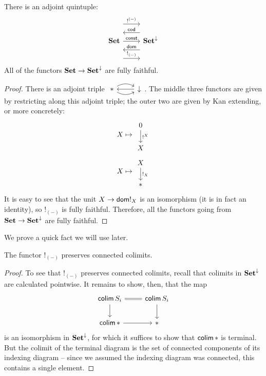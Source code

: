 \begin{prop}
  There is an adjoint quintuple:
  \[
    \begin{tikzcd}
      \Set \arrow[r, "\const"] \arrow[r, leftarrow, shift left = 5,
      "\term{cod}"] \arrow[r, leftarrow, shift right = 5, "\term{dom}"]
      \arrow[r, shift left = 10, "!^{(-)}"]  \arrow[r, shift right = 10, "!_{(-)}"] & \Set^{\downarrow}
    \end{tikzcd}
  \]
  All of the functors $\operatorname{\textbf{Set}} \to \operatorname{\textbf{Set}}^{\downarrow}$ are fully faithful.
\end{prop}
\begin{proof}
There is an adjoint triple $\begin{tikzcd} \ast \arrow[r,leftarrow] \arrow[r,
  bend left] \arrow[r, bend right] & \downarrow \end{tikzcd}$. The middle three
functors are given by restricting along this adjoint triple; the outer two are
given by Kan extending, or more concretely:
  $$X \mapsto \begin{tikzcd} 0 \arrow[d, "!^X"] \\ X \end{tikzcd}$$
  $$X \mapsto \begin{tikzcd} X \arrow[d, "!_X"] \\ \ast \end{tikzcd}$$
It is easy to see that the unit $X \to \mathsf{{dom}} !_{X}$ is an isomorphism (it is in
fact an identity), so $!_{(-)}$ is fully faithful. Therefore, all the functors
going from $\operatorname{\textbf{Set}} \to \operatorname{\textbf{Set}}^{\downarrow}$ are fully faithful.
\end{proof}

We prove a quick fact we will use later.
\begin{lem}\label{lem:bang.preserves.connected.colimits}
  The functor $!_{(-)}$ preserves connected colimits.
\end{lem}
\begin{proof}
  To see that $!_{(-)}$ preserves connected colimits, recall that colimits in $\operatorname{\textbf{Set}}^{\downarrow}$ are calculated pointwise. It remains to show, then, that the map
  \[
    \begin{tikzcd}
    \colim S_i \arrow[r, equals] \arrow[d] & \colim S_i \arrow[d] \\
    \colim \ast \arrow[r] & \ast 
    \end{tikzcd}
  \]
  is an isomorphism in $\operatorname{\textbf{Set}}^{\downarrow}$, for which it suffices to show that
  $\operatorname{\mathsf{colim}} \ast$ is terminal. But the colimit of the terminal diagram is the set
  of connected components of its indexing diagram -- since we assumed the
  indexing diagram was connected, this contains a single element.
\end{proof}

